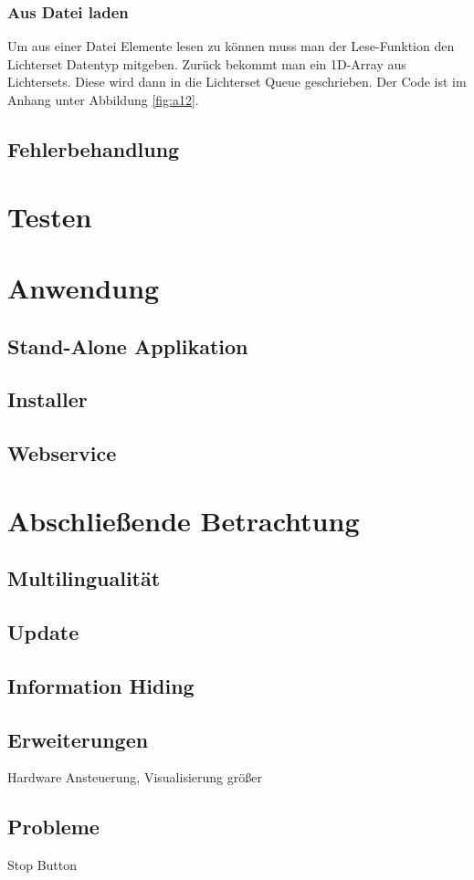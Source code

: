 \subsubsection{Aus Datei laden}
Um aus einer Datei Elemente lesen zu können muss man der Lese-Funktion den Lichterset Datentyp mitgeben. Zurück bekommt man ein 1D-Array aus Lichtersets. Diese wird dann in die Lichterset Queue geschrieben. Der Code ist im Anhang unter Abbildung \ref{fig:a12}.


\subsection{Fehlerbehandlung}

\section{Testen}		

\section{Anwendung}
	\subsection{Stand-Alone Applikation}
	\subsection{Installer}
	\subsection{Webservice}

\section{Abschließende Betrachtung}
	\subsection{Multilingualität}
	\subsection{Update }%
	\subsection{Information Hiding} %
	\subsection{Erweiterungen}
	Hardware Ansteuerung, Visualisierung größer
	
	\subsection{Probleme}
	Stop Button

